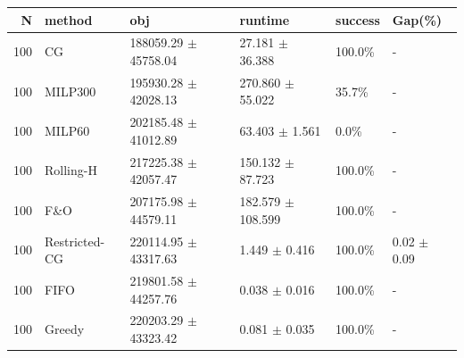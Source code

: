 \begin{tabular}{rlllll}
\toprule
N & method & obj & runtime & success & Gap(\%) \\
\midrule
100 & CG & 188059.29 $\pm$ 45758.04 & 27.181 $\pm$ 36.388 & 100.0\% & - \\
100 & MILP300 & 195930.28 $\pm$ 42028.13 & 270.860 $\pm$ 55.022 & 35.7\% & - \\
100 & MILP60 & 202185.48 $\pm$ 41012.89 & 63.403 $\pm$ 1.561 & 0.0\% & - \\
100 & Rolling-H & 217225.38 $\pm$ 42057.47 & 150.132 $\pm$ 87.723 & 100.0\% & - \\
100 & F\&O & 207175.98 $\pm$ 44579.11 & 182.579 $\pm$ 108.599 & 100.0\% & - \\
100 & Restricted-CG & 220114.95 $\pm$ 43317.63 & 1.449 $\pm$ 0.416 & 100.0\% & 0.02 $\pm$ 0.09 \\
100 & FIFO & 219801.58 $\pm$ 44257.76 & 0.038 $\pm$ 0.016 & 100.0\% & - \\
100 & Greedy & 220203.29 $\pm$ 43323.42 & 0.081 $\pm$ 0.035 & 100.0\% & - \\
\bottomrule
\end{tabular}
